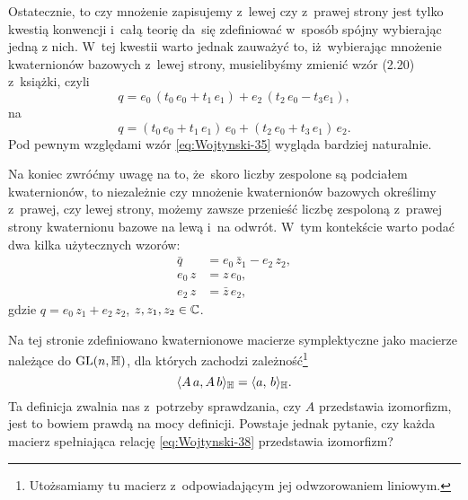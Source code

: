 \documentclass[a4paper,11pt]{article}
\begin{document}
Ostatecznie, to czy mnożenie zapisujemy z~lewej czy z~prawej strony jest
tylko kwestią konwencji i~całą teorię da~się zdefiniować w~sposób spójny
wybierając jedną z nich. W~tej kwestii warto jednak zauważyć to,
iż~wybierając mnożenie kwaternionów bazowych z~lewej strony, musielibyśmy
zmienić wzór (2.20) z~książki, czyli
\begin{equation}
  \label{eq:Wojtynski-35}
  q =
  e_{ 0 } \, ( t_{ 0 } \, e_{ 0 } + t_{ 1 } \, e_{ 1 } )
  + e_{ 2 } \, ( t_{ 2 } \, e_{ 0 } - t_{ 3 } e_{ 1 } ),
\end{equation}
na
\begin{equation}
  \label{eq:Wojtynski-36}
  q =
  ( t_{ 0 } \, e_{ 0 } + t_{ 1 } \, e_{ 1 } ) \, e_{ 0 }
  + ( t_{ 2 } \, e_{ 0 } + t_{ 3 } \, e_{ 1 } ) \, e_{ 2 }.
\end{equation}
Pod pewnym względami wzór \eqref{eq:Wojtynski-35} wygląda bardziej
naturalnie.

Na koniec zwróćmy uwagę na to, że~skoro liczby zespolone są podciałem
kwaternionów, to niezależnie czy mnożenie kwaternionów bazowych określimy
z~prawej, czy lewej strony, możemy zawsze przenieść liczbę zespoloną
z~prawej strony kwaternionu bazowe na lewą i~na odwrót. W~tym kontekście
warto podać dwa kilka użytecznych wzorów:
\begin{subequations}
  \begin{align}
    \label{eq:Wojtynski-37-A}
    \bar{q} &= e_{ 0 } \, \bar{z}_{ 1 } - e_{ 2 } \, z_{ 2 }, \\
    \label{eq:Wojtynski-37-B}
    e_{ 0 } \, z &= z \, e_{ 0 }, \\
    \label{eq:Wojtynski-37-C}
    e_{ 2 } \, z &= \bar{z} \, e_{ 2 },
  \end{align}
\end{subequations}
gdzie $q = e_{ 0 } \, z_{ 1 } + e_{ 2 } \, z_{ 2 }$, $z, z_{ 1 }, z_{ 2 } \in \mathbb{C}$.

\vspace{\spaceFour}





 Na tej stronie zdefiniowano kwaternionowe macierze symplektyczne
jako macierze należące do $\mathrm{GL}( n, \mathbb{H} )$, dla których zachodzi
zależność\footnote{Utożsamiamy tu macierz z~odpowiadającym jej
  odwzorowaniem liniowym.}
\begin{equation}
  \label{eq:Wojtynski-38}
  \langle A \, a, A \, b \rangle_{ \mathbb{H} } = \langle a, \, b \rangle_{ \mathbb{H} }.
\end{equation}
Ta definicja zwalnia nas z~potrzeby sprawdzania, czy $A$ przedstawia
izomorfizm, jest to bowiem prawdą na mocy definicji. Powstaje jednak
pytanie, czy każda macierz spełniająca relację \eqref{eq:Wojtynski-38}
przedstawia izomorfizm?
\end{document}
